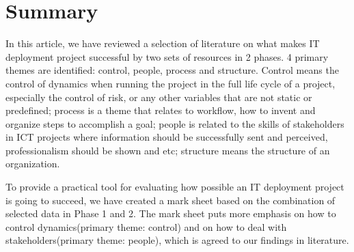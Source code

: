 
\section{Summary}

In this article, we have reviewed a selection of literature on what makes IT deployment project successful by two sets of resources in 2 phases. 4 primary themes are identified: control, people, process and structure. Control means the control of dynamics when running the project in the full life cycle of a project, especially the control of risk, or any other variables that are not static or predefined; process is a theme that relates to workflow, how to invent and organize steps to accomplish a goal; people is related to the skills of stakeholders in ICT projects where information should be successfully sent and perceived, professionalism should be shown and etc; structure means the structure of an organization.

To provide a practical tool for evaluating how possible an IT deployment project is going to succeed, we have created a mark sheet based on the combination of selected data in Phase 1 and 2. The mark sheet puts more emphasis on how to control dynamics(primary theme: control) and on how to deal with stakeholders(primary theme: people), which is agreed to our findings in literature.

